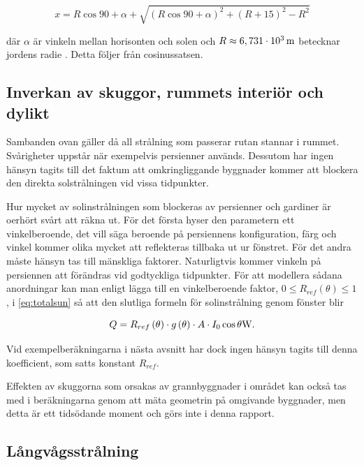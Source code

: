 \begin{equation}
x = R\cos{90+\alpha} + \sqrt{\left(R\cos{90+\alpha}\right)^2 + \left( R+15\right)^2 - R^2}
\end{equation}

där $\alpha$ är vinkeln mellan horisonten och solen och $R\approx\unit[6,731\cdot 10^3]{m}$ betecknar jordens radie \cite{physicshandbook}. Detta följer från cosinussatsen. %

\subsection{Inverkan av skuggor, rummets interiör och dylikt}

Sambanden ovan gäller då all strålning som passerar rutan stannar i rummet. Svårigheter uppstår när exempelvis persienner används. Dessutom har ingen hänsyn tagits till det faktum att omkringliggande byggnader kommer att blockera den direkta solstrålningen vid vissa tidpunkter.

Hur mycket av solinstrålningen som blockeras av persienner och gardiner är oerhört svårt att räkna ut. För det första hyser den parametern ett vinkelberoende, det vill säga beroende på persiennens konfiguration, färg och vinkel kommer olika mycket att reflekteras tillbaka ut ur fönstret. För det andra måste hänsyn tas till mänskliga faktorer. Naturligtvis kommer vinkeln på persiennen att förändras vid godtyckliga tidpunkter. För att modellera sådana anordningar kan man enligt \cite{ASHRAE09} lägga till en vinkelberoende faktor, $0 \le R_{ref}\left( \theta \right) \le 1$, i \eqref{eq:totalsun} så att den slutliga formeln för solinstrålning genom fönster blir


\begin{equation}\label{eq:totalsunblinds}
Q = R_{ref}\left( \theta \right) \cdot g\left( \theta \right) \cdot A \cdot I_0 \cos{\theta} \unit[]{W}.
\end{equation}

Vid exempelberäkningarna i nästa avsnitt har dock ingen hänsyn tagits till denna koefficient, som satts konstant $R_{ref}$.

Effekten av skuggorna som orsakas av grannbyggnader i området kan också tas med i beräkningarna genom att mäta geometrin på omgivande byggnader, men detta är ett tidsödande moment och görs inte i denna rapport.

\subsection{Långvågsstrålning}\label{subsec:IRmethod}

